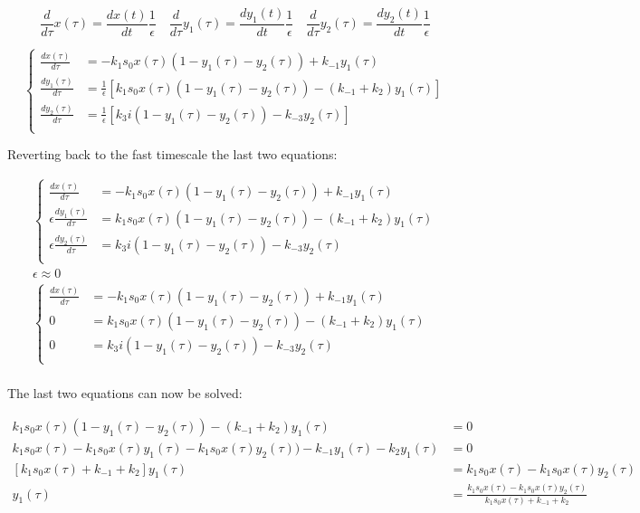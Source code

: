     $$\frac{d}{d\tau}x(\tau) = \frac{dx(t)}{dt}\frac{1}{\epsilon}\quad \frac{d}{d\tau}y_1(\tau) = \frac{dy_1(t)}{dt}\frac{1}{\epsilon}\quad \frac{d}{d\tau}y_2(\tau) = \frac{dy_2(t)}{dt}\frac{1}{\epsilon}$$

    $$\begin{cases}
      \frac{dx(\tau)}{d\tau} &= -k_1s_0x(\tau)(1-y_1(\tau) -y_2(\tau)) + k_{-1}y_1(\tau)\\
      \frac{dy_1(\tau)}{d\tau} &= \frac{1}{\epsilon}\left[k_1s_0x(\tau)(1-y_1(\tau) -y_2(\tau)) - (k_{-1}+k_2)y_1(\tau)\right]\\
      \frac{dy_2(\tau)}{d\tau} &= \frac{1}{\epsilon}\left[k_3i(1-y_1(\tau)-y_2(\tau))-k_{-3}y_2(\tau)\right]\\
    \end{cases}$$

    Reverting back to the fast timescale the last two equations:

    \begin{align*}
      \begin{cases}
        \frac{dx(\tau)}{d\tau} &= -k_1s_0x(\tau)(1-y_1(\tau) -y_2(\tau)) + k_{-1}y_1(\tau)\\
        \epsilon\frac{dy_1(\tau)}{d\tau} &= k_1s_0x(\tau)(1-y_1(\tau) -y_2(\tau)) - (k_{-1}+k_2)y_1(\tau)\\
        \epsilon\frac{dy_2(\tau)}{d\tau} &= k_3i(1-y_1(\tau)-y_2(\tau))-k_{-3}y_2(\tau)\\
      \end{cases}\\
      \epsilon\approx 0\\
      \begin{cases}
        \frac{dx(\tau)}{d\tau} &= -k_1s_0x(\tau)(1-y_1(\tau) -y_2(\tau)) + k_{-1}y_1(\tau)\\
        0 &= k_1s_0x(\tau)(1-y_1(\tau) -y_2(\tau)) - (k_{-1}+k_2)y_1(\tau)\\
        0 &= k_3i(1-y_1(\tau)-y_2(\tau))-k_{-3}y_2(\tau)\\
      \end{cases}\\
    \end{align*}

    The last two equations can now be solved:

    \begin{align*}
      k_1s_0x(\tau)(1-y_1(\tau) -y_2(\tau)) - (k_{-1}+k_2)y_1(\tau)&=0\\
      k_1s_0x(\tau)-k_1s_0x(\tau)y_1(\tau) -k_1s_0x(\tau)y_2(\tau)) - k_{-1}y_1(\tau)-k_2y_1(\tau)&=0\\
      [k_1s_0x(\tau) + k_{-1}+k_2]y_1(\tau) &= k_1s_0x(\tau) -k_1s_0x(\tau)y_2(\tau)\\
      y_1(\tau) &=\frac{k_1s_0x(\tau)-k_1s_0x(\tau)y_2(\tau)}{k_1s_0x(\tau) + k_{-1}+k_2}\\
    \end{align*}

